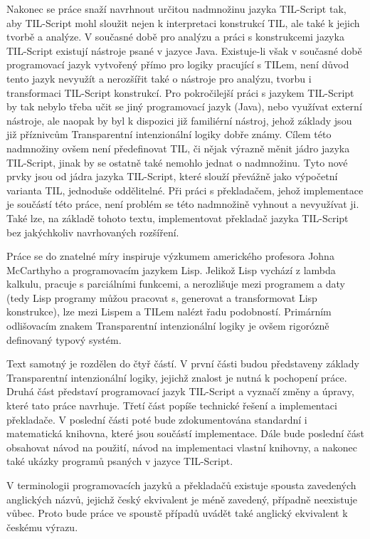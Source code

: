 Nakonec se práce snaží navrhnout určitou nadmnožinu jazyka TIL-Script tak, aby TIL-Script mohl
sloužit nejen k interpretaci konstrukcí TIL, ale také k jejich tvorbě a analýze. V současné době
pro analýzu a práci s konstrukcemi jazyka TIL-Script existují nástroje psané v jazyce Java.
Existuje-li však v současné době programovací jazyk vytvořený přímo pro logiky pracující s TILem,
není důvod tento jazyk nevyužít a nerozšířit také o nástroje pro analýzu, tvorbu i transformaci
TIL-Script konstrukcí. Pro pokročilejší práci s jazykem TIL-Script by tak nebylo třeba učit se jiný
programovací jazyk (Java), nebo využívat externí nástroje, ale naopak by byl k dispozici již
familiérní nástroj, jehož základy jsou již příznivcům Transparentní intenzionální logiky dobře
známy. Cílem této nadmnožiny ovšem není předefinovat TIL, či nějak výrazně měnit jádro jazyka
TIL-Script, jinak by se ostatně také nemohlo jednat o nadmnožinu. Tyto nové prvky jsou od jádra
jazyka TIL-Script, které slouží převážně jako výpočetní varianta TIL, jednoduše oddělitelné. Při
práci s překladačem, jehož implementace je součástí této práce, není problém se této nadmnožině
vyhnout a nevyužívat ji. Také lze, na základě tohoto textu, implementovat překladač jazyka
TIL-Script bez jakýchkoliv navrhovaných rozšíření.

Práce se do znatelné míry inspiruje výzkumem amerického profesora Johna McCarthyho a programovacím
jazykem Lisp. Jelikož Lisp vychází z lambda kalkulu, pracuje s parciálními funkcemi, a nerozlišuje
mezi programem a daty (tedy Lisp programy můžou pracovat s, generovat a transformovat Lisp
konstrukce), lze mezi Lispem a TILem nalézt řadu podobností. Primárním odlišovacím znakem
Transparentní intenzionální logiky je ovšem rigorózně definovaný typový systém.

Text samotný je rozdělen do čtyř částí. V první části budou představeny základy Transparentní
intenzionální logiky, jejichž znalost je nutná k pochopení práce. Druhá část představí programovací
jazyk TIL-Script a vyznačí změny a úpravy, které tato práce navrhuje. Třetí část popíše technické
řešení a implementaci překladače. V poslední části poté bude zdokumentována standardní i
matematická knihovna, které jsou součástí implementace. Dále bude poslední část obsahovat návod
na použití, návod na implementaci vlastní knihovny, a nakonec také ukázky programů psaných v jazyce
TIL-Script.

V terminologii programovacích jazyků a překladačů existuje spousta zavedených anglických názvů,
jejichž český ekvivalent je méně zavedený, případně neexistuje vůbec. Proto bude práce ve spoustě
případů uvádět také anglický ekvivalent k českému výrazu.

\endinput
